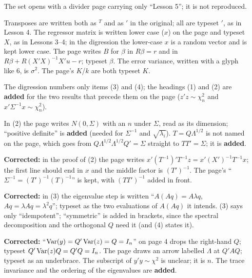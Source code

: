\documentclass[11pt]{article}
\begin{document}
\begin{transcriptnotes}
  \item The set opens with a divider page carrying only ``Lesson 5''; it is not
        reproduced.
  \item Transposes are written both as $^{T}$ and as $'$ in the original; all are
        typeset $'$, as in Lesson 4. The regressor matrix is written lower case
        ($x$) on the page and typeset $X$, as in Lessons 3--4; in the digression the
        lower-case $x$ is a random vector and is kept lower case. The page writes
        $B$ for $\beta$ in $R\beta = r$ and in $R\beta + R(X'X)^{-1}X'u - r$; typeset
        $\beta$. The error variance, written with a glyph like $6$, is $\sigma^{2}$.
        The page's $K$/$k$ are both typeset $K$.
  \item The digression numbers only items (3) and (4); the headings (1) and (2)
        are \textbf{added} for the two results that precede them on the page
        ($z'z \sim \chi^{2}_{n}$ and $x'\Sigma^{-1}x \sim \chi^{2}_{n}$).
  \item In (2) the page writes $N(0, \Sigma)$ with an $n$ under $\Sigma$, read as its
        dimension; ``positive definite'' is \textbf{added} (needed for
        $\Sigma^{-1}$ and $\sqrt{\lambda_{i}}$). $T = Q\Lambda^{1/2}$ is not named on
        the page, which goes from $Q\Lambda^{1/2}\Lambda^{1/2}Q' = \Sigma$ straight to
        $TT' = \Sigma$; it is \textbf{added}.
  \item \textbf{Corrected:} in the proof of (2) the page writes
        $x'(T^{-1})'T^{-1}z = x'(X')^{-1}T^{-1}x$; the first line should end in $x$
        and the middle factor is $(T')^{-1}$. The page's ``$\Sigma^{-1} =
        (T')^{-1}(T)^{-1}$'' is kept, with $(TT')^{-1}$ added in front.
  \item \textbf{Corrected:} in (3) the eigenvalue step is written
        ``$A(Aq) = A\lambda q$, $Aq = \lambda Aq = \lambda^{2}q$''; typeset as the two
        evaluations of $A(Aq)$ it intends. (3) says only ``idempotent''; ``symmetric''
        is added in brackets, since the spectral decomposition and the orthogonal
        $Q$ need it (and (4) states it).
  \item \textbf{Corrected:} ``$\operatorname{Var}(y) = Q'\operatorname{Var}(z) = Q = I_{n}$'' on page 4 drops the
        right-hand $Q$; typeset $Q'\operatorname{Var}(z)Q = Q'Q = I_{n}$. The page draws an
        arrow labelled $\Lambda$ at $Q'AQ$; typeset as an underbrace. The subscript of
        $y'y \sim \chi^{2}$ is unclear; it is $n$. The trace invariance and the
        ordering of the eigenvalues are \textbf{added}.

\end{transcriptnotes}
\end{document}
